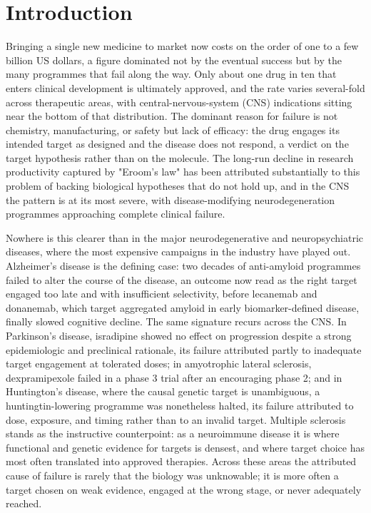 \documentclass[11pt,twocolumn]{article}
\begin{document}
\section{Introduction}

Bringing a single new medicine to market now costs on the order of one to a few billion US dollars, a figure dominated not by the eventual success but by the many programmes that fail along the way.\cite{ref1,ref2} Only about one drug in ten that enters clinical development is ultimately approved, and the rate varies several-fold across therapeutic areas, with central-nervous-system (CNS) indications sitting near the bottom of that distribution.\cite{ref3,ref4,ref5} The dominant reason for failure is not chemistry, manufacturing, or safety but lack of efficacy: the drug engages its intended target as designed and the disease does not respond, a verdict on the target hypothesis rather than on the molecule.\cite{ref6,ref7} The long-run decline in research productivity captured by "Eroom's law" has been attributed substantially to this problem of backing biological hypotheses that do not hold up,\cite{ref8} and in the CNS the pattern is at its most severe, with disease-modifying neurodegeneration programmes approaching complete clinical failure.\cite{ref9,ref10}

Nowhere is this clearer than in the major neurodegenerative and neuropsychiatric diseases, where the most expensive campaigns in the industry have played out. Alzheimer's disease is the defining case: two decades of anti-amyloid programmes failed to alter the course of the disease, an outcome now read as the right target engaged too late and with insufficient selectivity, before lecanemab and donanemab, which target aggregated amyloid in early biomarker-defined disease, finally slowed cognitive decline.\cite{ref11,ref12,ref13} The same signature recurs across the CNS. In Parkinson's disease, isradipine showed no effect on progression despite a strong epidemiologic and preclinical rationale, its failure attributed partly to inadequate target engagement at tolerated doses;\cite{ref14} in amyotrophic lateral sclerosis, dexpramipexole failed in a phase 3 trial after an encouraging phase 2;\cite{ref15} and in Huntington's disease, where the causal genetic target is unambiguous, a huntingtin-lowering programme was nonetheless halted, its failure attributed to dose, exposure, and timing rather than to an invalid target.\cite{ref16} Multiple sclerosis stands as the instructive counterpoint: as a neuroimmune disease it is where functional and genetic evidence for targets is densest, and where target choice has most often translated into approved therapies.\cite{ref17} Across these areas the attributed cause of failure is rarely that the biology was unknowable; it is more often a target chosen on weak evidence, engaged at the wrong stage, or never adequately reached.
\end{document}
